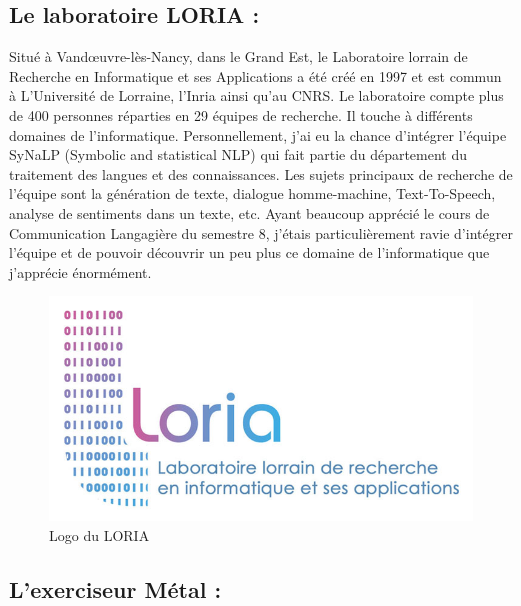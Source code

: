 \documentclass[12pt]{article}
\begin{document}
\subsection{Le laboratoire LORIA :}

Situé à Vandœuvre-lès-Nancy, dans le Grand Est, le Laboratoire lorrain de Recherche en Informatique et ses Applications a été créé en 1997 et est commun à L’Université de Lorraine, l’Inria ainsi qu’au CNRS. Le laboratoire compte plus de 400 personnes réparties en 29 équipes de recherche. Il touche à différents domaines de l’informatique. 
Personnellement, j’ai eu la chance d’intégrer l’équipe SyNaLP (Symbolic and statistical NLP) qui fait partie du département du traitement des langues et des connaissances. Les sujets principaux de recherche de l’équipe sont la génération de texte, dialogue homme-machine, Text-To-Speech, analyse de sentiments dans un texte, etc. Ayant beaucoup apprécié le cours de Communication Langagière du semestre 8, j’étais particulièrement ravie d’intégrer l’équipe et de pouvoir découvrir un peu plus ce domaine de l’informatique que j’apprécie énormément. 



\begin{figure}[h]
    \centering
    \includegraphics[scale = 0.3]{logo_loria_complet.jpg}
    \caption{Logo du LORIA}
    \label{fig:my_label}
\end{figure}


\subsection{L'exerciseur Métal :}
\end{document}
